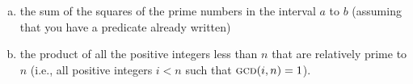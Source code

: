 \begin{exerciseGroup}
\begin{enumerate}[a.]

\item
the sum of the squares of the prime numbers in the interval \( a \) to \( b \)
(assuming that you have a  predicate already written)

\item
the product of all the positive integers less than \( n \) that are relatively
prime to \( n \) (i.e., all positive integers \( i < n \) such that
\( \textsc{gcd}(i, n) = 1 \)).

\end{enumerate}
\end{exerciseGroup}

